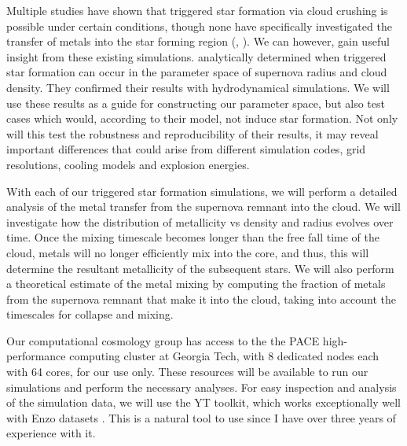 \documentclass[12pt]{article}
\begin{document}
Multiple studies have shown that triggered star formation via cloud crushing is possible under certain conditions, though none have specifically investigated the transfer of metals into the star forming region (\cite{Melioli2006}, \cite{Leao2009}). We can however, gain useful insight from these existing simulations. \cite{Melioli2006} analytically determined when triggered star formation can occur in the parameter space of supernova radius and cloud density. They confirmed their results with hydrodynamical simulations. We will use these results as a guide for constructing our parameter space, but also test cases which would, according to their model, not induce star formation. Not only will this test the robustness and reproducibility of their results, it may reveal important differences that could arise from different simulation codes, grid resolutions, cooling models and explosion energies.

With each of our triggered star formation simulations, we will perform a detailed analysis of the metal transfer from the supernova remnant into the cloud. We will investigate how the distribution of metallicity vs density and radius evolves over time. Once the mixing timescale becomes longer than the free fall time of the cloud, metals will no longer efficiently mix into the core, and thus, this will determine the resultant metallicity of the subsequent stars. We will also perform a theoretical estimate of the metal mixing by computing the fraction of metals from the supernova remnant that make it into the cloud, taking into account the timescales for collapse and mixing. 

Our computational cosmology group has access to the the PACE high-performance computing cluster at Georgia Tech, with 8 dedicated nodes each with 64 cores, for our use only. These resources will be available to run our simulations and perform the necessary analyses. For easy inspection and analysis of the simulation data, we will use the YT toolkit, which works exceptionally well with Enzo datasets \citep{Turk2011}. This is a natural tool to use since I have over three years of experience with it.
\end{document}
